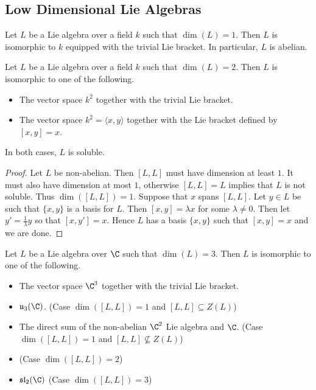 \documentclass[a4paper]{article}
\begin{document}
\subsection{Low Dimensional Lie Algebras}
\begin{prp}{}{} Let $L$ be a Lie algebra over a field $k$ such that $\dim(L)=1$. Then $L$ is isomorphic to $k$ equipped with the trivial Lie bracket. In particular, $L$ is abelian. 
\end{prp}

\begin{prp}{}{} Let $L$ be a Lie algebra over a field $k$ such that $\dim(L)=2$. Then $L$ is isomorphic to one of the following. 
\begin{itemize}
\item The vector space $k^2$ together with the trivial Lie bracket. 
\item The vector space $k^2=\langle x,y\rangle$ together with the Lie bracket defined by $[x,y]=x$. 
\end{itemize} 
In both cases, $L$ is soluble. \tcbline
\begin{proof}
Let $L$ be non-abelian. Then $[L,L]$ must have dimension at least $1$. It must also have dimension at most $1$, otherwise $[L,L]=L$ implies that $L$ is not soluble. Thus $\dim([L,L])=1$. Suppose that $x$ spans $[L,L]$. Let $y\in L$ be such that $\{x,y\}$ is a basis for $L$. Then $[x,y]=\lambda x$ for some $\lambda\neq 0$. Then let $y'=\frac{1}{\lambda}y$ so that $[x,y']=x$. Hence $L$ has a basis $\{x,y\}$ such that $[x,y]=x$ and we are done. 
\end{proof}
\end{prp}

\begin{prp}{}{} Let $L$ be a Lie algebra over $\C$ such that $\dim(L)=3$. Then $L$ is isomorphic to one of the following. 
\begin{itemize}
\item The vector space $\C^3$ together with the trivial Lie bracket. 
\item $\mathfrak{u}_3(\C)$. (Case $\dim([L,L])=1$ and $[L,L]\subseteq Z(L)$)
\item The direct sum of the non-abelian $\C^2$ Lie algebra and $\C$. (Case $\dim([L,L])=1$ and $[L,L]\not\subseteq Z(L)$)
\item (Case $\dim([L,L])=2$)
\item $\mathfrak{sl}_2(\C)$ (Case $\dim([L,L])=3$)
\end{itemize}
\end{prp}
\end{document}
